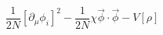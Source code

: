 \begin{equation}
 \frac{1}{2 N} [
\partial_\mu \phi_i ]^2-
\frac{1}{2 N } \chi {\vec \phi \cdot \vec \phi}-  V[{\rho}]
\end{equation}


